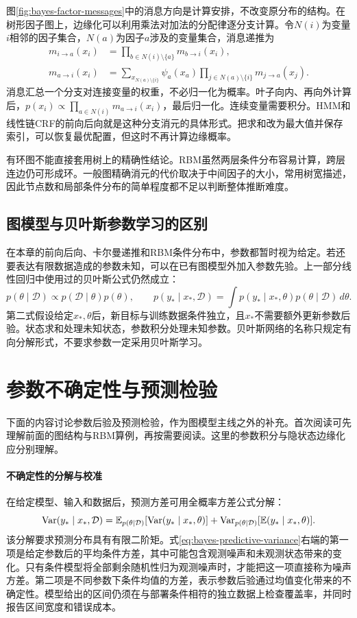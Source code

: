 图\ref{fig:bayes-factor-messages}中的消息方向是计算安排，不改变原分布的结构。在树形因子图上，边缘化可以利用乘法对加法的分配律逐分支计算。令$N(i)$为变量$i$相邻的因子集合，$N(a)$为因子$a$涉及的变量集合，消息递推为
\begin{align}
 m_{i\to a}(x_i)&=\prod_{b\in N(i)\setminus\{a\}}m_{b\to i}(x_i),\\
 m_{a\to i}(x_i)&=\sum_{x_{N(a)\setminus\{i\}}}\psi_a(x_a)
 \prod_{j\in N(a)\setminus\{i\}}m_{j\to a}(x_j).
\end{align}
消息汇总一个分支对连接变量的权重，不必归一化为概率。叶子向内、再向外计算后，$p(x_i)\propto\prod_{a\in N(i)}m_{a\to i}(x_i)$，最后归一化。连续变量需要积分。HMM和线性链CRF的前向后向就是这种分支消元的具体形式。把求和改为最大值并保存索引，可以恢复最优配置，但这时不再计算边缘概率。

有环图不能直接套用树上的精确性结论。RBM虽然两层条件分布容易计算，跨层连边仍可形成环。一般图精确消元的代价取决于中间因子的大小，常用树宽描述，因此节点数和局部条件分布的简单程度都不足以判断整体推断难度。

\subsection{图模型与贝叶斯参数学习的区别}
在本章的前向后向、卡尔曼递推和RBM条件分布中，参数都暂时视为给定。若还要表达有限数据造成的参数未知，可以在已有图模型外加入参数先验。上一部分线性回归中使用过的贝叶斯公式仍然成立：
\begin{equation}
 p(\theta\mid\mathcal D)\propto p(\mathcal D\mid\theta)p(\theta),\qquad
 p(y_*\mid x_*,\mathcal D)=\int p(y_*\mid x_*,\theta)p(\theta\mid\mathcal D)\,d\theta.
 \label{eq:bayes-predictive-integral}
\end{equation}
第二式假设给定$x_*,\theta$后，新目标与训练数据条件独立，且$x_*$不需要额外更新参数后验。状态求和处理未知状态，参数积分处理未知参数。贝叶斯网络的名称只规定有向分解形式，不要求参数一定采用贝叶斯学习。

\section*{参数不确定性与预测检验}
下面的内容讨论参数后验及预测检验，作为图模型主线之外的补充。首次阅读可先理解前面的图结构与RBM算例，再按需要阅读。这里的参数积分与隐状态边缘化应分别理解。
\paragraph{不确定性的分解与校准}
在给定模型、输入和数据后，预测方差可用全概率方差公式分解：
\begin{equation}
 \operatorname{Var}(y_*\mid x_*,\mathcal D)=\mathbb E_{p(\theta\mid\mathcal D)}[\operatorname{Var}(y_*\mid x_*,\theta)]
 +\operatorname{Var}_{p(\theta\mid\mathcal D)}[\mathbb E(y_*\mid x_*,\theta)].\label{eq:bayes-predictive-variance}
\end{equation}
该分解要求预测分布具有有限二阶矩。式\eqref{eq:bayes-predictive-variance}右端的第一项是给定参数后的平均条件方差，其中可能包含观测噪声和未观测状态带来的变化。只有条件模型将全部剩余随机性归为观测噪声时，才能把这一项直接称为噪声方差。第二项是不同参数下条件均值的方差，表示参数后验通过均值变化带来的不确定性。模型给出的区间仍须在与部署条件相符的独立数据上检查覆盖率，并同时报告区间宽度和错误成本。

